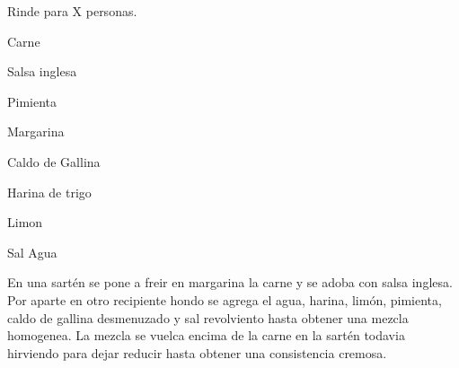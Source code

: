
Rinde para X personas.


\begin{ingredientes}
\item Carne
\item Salsa inglesa
\item Pimienta
\item Margarina
\item Caldo de Gallina
\item Harina de trigo
\item Limon
\item Sal
\Item Agua
\end{ingredientes}
\preparacion
En una sartén se pone a freir en margarina la carne y se adoba con salsa inglesa. \\

Por aparte en otro recipiente hondo se agrega el agua, harina, limón, pimienta, caldo de gallina desmenuzado y sal revolviento hasta obtener una mezcla homogenea. La mezcla se vuelca encima de la carne en la sartén todavia hirviendo para dejar reducir hasta obtener una consistencia cremosa.